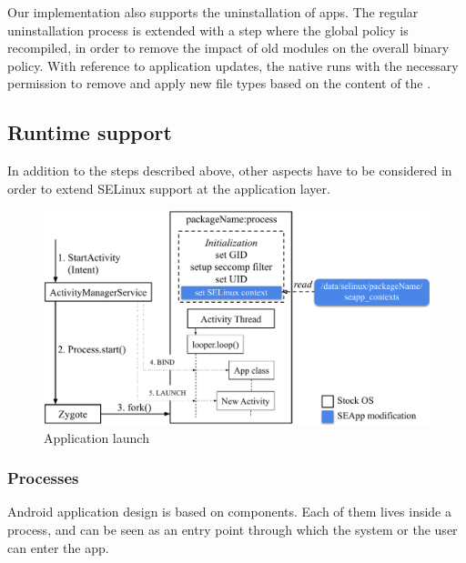 Our implementation also supports the uninstallation of \pap apps.  The
regular uninstallation process is extended with a step where the
global policy is recompiled, in order to remove the impact of old
modules on the overall binary policy.  With reference to application
updates, the native \installd runs with the necessary permission to
remove and apply new file types based on the content of the
\filecontexts.

\subsection{Runtime support}\label{sect:seapp_app_runtime}

In addition to the steps described above, other aspects have to be
considered in order to extend SELinux support at the application
layer.

\begin{figure}[h]
  \centering
  \includegraphics[width=0.8\columnwidth]{chapters/seapp/figs/app_launch}
  \caption{\label{fig:seapp_runtime} Application launch}
\end{figure}

\subsubsection{Processes}

Android application design is based on components.  Each of them lives
inside a process, and can be seen as an entry point through which the
system or the user can enter the app.

